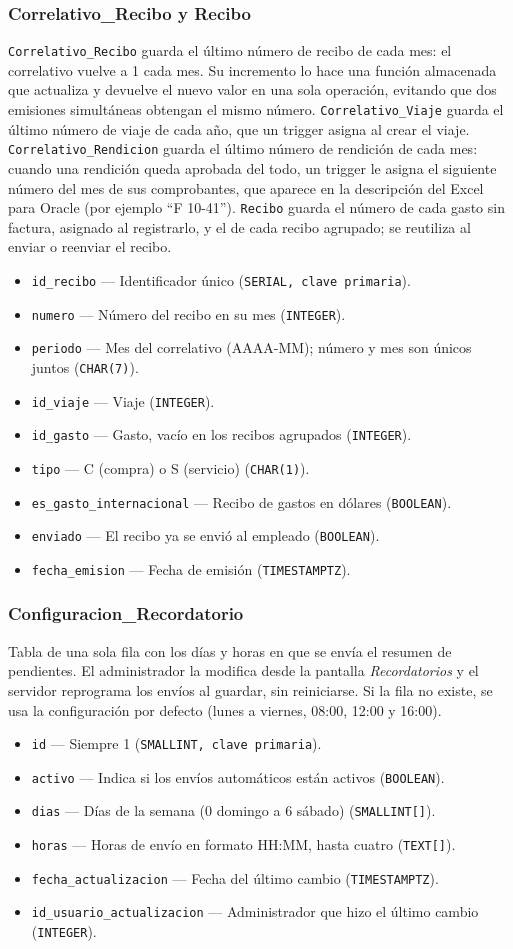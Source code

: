 \documentclass[11pt,letterpaper]{article}
\newcommand{\code}[1]{\nolinkurl{#1}}
\newcommand{\campo}[3]{\item \code{#1} --- #2 (\texttt{#3}).}
\begin{document}
\subsubsection{Correlativo\_Recibo y Recibo}
\code{Correlativo_Recibo} guarda el último número de recibo de cada mes: el correlativo vuelve a 1 cada mes. Su incremento lo hace una función almacenada que actualiza y devuelve el nuevo valor en una sola operación, evitando que dos emisiones simultáneas obtengan el mismo número. \code{Correlativo_Viaje} guarda el último número de viaje de cada año, que un trigger asigna al crear el viaje. \code{Correlativo_Rendicion} guarda el último número de rendición de cada mes: cuando una rendición queda aprobada del todo, un trigger le asigna el siguiente número del mes de sus comprobantes, que aparece en la descripción del Excel para Oracle (por ejemplo ``F 10-41''). \code{Recibo} guarda el número de cada gasto sin factura, asignado al registrarlo, y el de cada recibo agrupado; se reutiliza al enviar o reenviar el recibo.
\begin{itemize}
  \campo{id_recibo}{Identificador único}{SERIAL, clave primaria}
  \campo{numero}{Número del recibo en su mes}{INTEGER}
  \campo{periodo}{Mes del correlativo (AAAA-MM); número y mes son únicos juntos}{CHAR(7)}
  \campo{id_viaje}{Viaje}{INTEGER}
  \campo{id_gasto}{Gasto, vacío en los recibos agrupados}{INTEGER}
  \campo{tipo}{C (compra) o S (servicio)}{CHAR(1)}
  \campo{es_gasto_internacional}{Recibo de gastos en dólares}{BOOLEAN}
  \campo{enviado}{El recibo ya se envió al empleado}{BOOLEAN}
  \campo{fecha_emision}{Fecha de emisión}{TIMESTAMPTZ}
\end{itemize}

\subsubsection{Configuracion\_Recordatorio}
Tabla de una sola fila con los días y horas en que se envía el resumen de pendientes. El administrador la modifica desde la pantalla \emph{Recordatorios} y el servidor reprograma los envíos al guardar, sin reiniciarse. Si la fila no existe, se usa la configuración por defecto (lunes a viernes, 08:00, 12:00 y 16:00).
\begin{itemize}
  \campo{id}{Siempre 1}{SMALLINT, clave primaria}
  \campo{activo}{Indica si los envíos automáticos están activos}{BOOLEAN}
  \campo{dias}{Días de la semana (0 domingo a 6 sábado)}{SMALLINT[]}
  \campo{horas}{Horas de envío en formato HH:MM, hasta cuatro}{TEXT[]}
  \campo{fecha_actualizacion}{Fecha del último cambio}{TIMESTAMPTZ}
  \campo{id_usuario_actualizacion}{Administrador que hizo el último cambio}{INTEGER}
\end{itemize}
\end{document}
